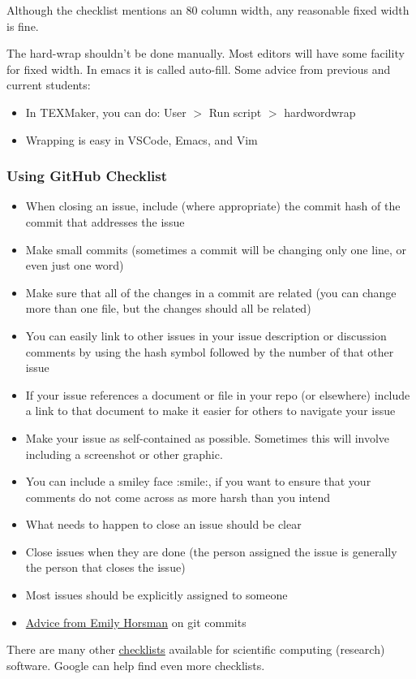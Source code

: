\documentclass[12pt]{article}
\begin{document}
Although the checklist mentions an 80 column width, any reasonable fixed width is fine.

The hard-wrap shouldn't be done manually. Most editors will have some facility for fixed width. In
emacs it is called auto-fill. Some advice from previous and current students:

\begin{itemize}
	\item In TEXMaker, you can do: User $>$ Run script $>$ hardwordwrap
	\item Wrapping is easy in VSCode, Emacs, and Vim
\end{itemize}

\subsubsection*{Using GitHub Checklist}

\begin{itemize}
	\item When closing an issue, include (where appropriate) the commit hash of the commit that addresses the
	      issue
	\item Make small commits (sometimes a commit will be changing only one line, or even just one word)
	\item Make sure that all of the changes in a commit are related (you can change more than one file, but
	      the changes should all be related)
	\item You can easily link to other issues in your issue description or discussion comments by using the
	      hash symbol followed by the number of that other issue
	\item If your issue references a document or file in your repo (or elsewhere) include a link to that
	      document to make it easier for others to navigate your issue
	\item Make your issue as self-contained as possible. Sometimes this will involve including a screenshot
	      or other graphic.
	\item You can include a smiley face :smile:, if you want to ensure that your comments do not come across
	      as more harsh than you intend
	\item What needs to happen to close an issue should be clear
	\item Close issues when they are done (the person assigned the issue is generally the person that closes
	      the issue)
	\item Most issues should be explicitly assigned to someone
	\item \href{https://gitlab.cas.mcmaster.ca/smiths/se2aa4_cs2me3/-/blob/master/FAQ/GitAdvice.txt} {Advice
		      from Emily Horsman} on git commits
\end{itemize}

There are many other
\href{https://gitlab.cas.mcmaster.ca/SEforSC/se4sc/-/wikis/Advice-and-Checklists-for-Repos-(including-a-list-of-recommended-artifacts)}{checklists}
available for scientific computing (research) software. Google can help find even more checklists.
\end{document}
